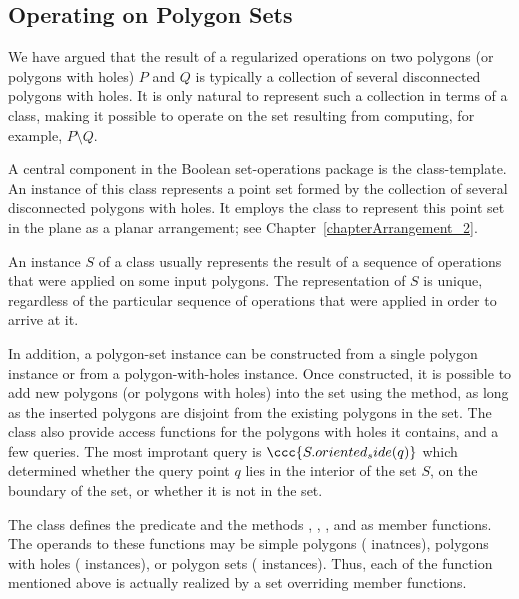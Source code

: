 \subsection{Operating on Polygon Sets}
\label{bops_ssec:main_component}

We have argued that the result of a regularized operations on two polygons
(or polygons with holes) $P$ and $Q$ is typically a collection of several
disconnected polygons with holes. It is only natural to represent such a
collection in terms of a class, making it possible to operate on the set
resulting from computing, for example, $P \setminus Q$.

A central component in the Boolean set-operations package is the
 class-template. An instance of this
class represents a point set formed by the collection of several disconnected
polygons with holes. It employs the  class to represent
this point set in the plane as a planar arrangement; see
Chapter~\ref{chapterArrangement_2}. 

An instance $S$ of a  class usually represents
the result of a sequence of operations that were applied on some input
polygons. The representation of $S$ is unique, regardless of the particular
sequence of operations that were applied in order to arrive at it.

In addition, a polygon-set instance can be constructed from a single polygon
instance or from a polygon-with-holes instance. Once constructed, it is
possible to add new polygons (or polygons with holes)
into the set using the  method, as long as the inserted
polygons are disjoint from the existing polygons in the set. 
The  class also provide access functions for
the polygons with holes it contains, and a few queries. The most improtant
query is $\ccc{S.oriented_side(q)}$ which determined whether the query point
$q$ lies in the interior of the set $S$, on the boundary of the set, or
whether it is not in the set.

The  class defines the predicate
 and the methods , ,
,  and  as member
functions. The operands to these functions may be simple polygons 
( inatnces), polygons with holes 
( instances), or polygon sets
( instances). Thus, each of the function mentioned
above is actually realized by a set overriding member functions.

